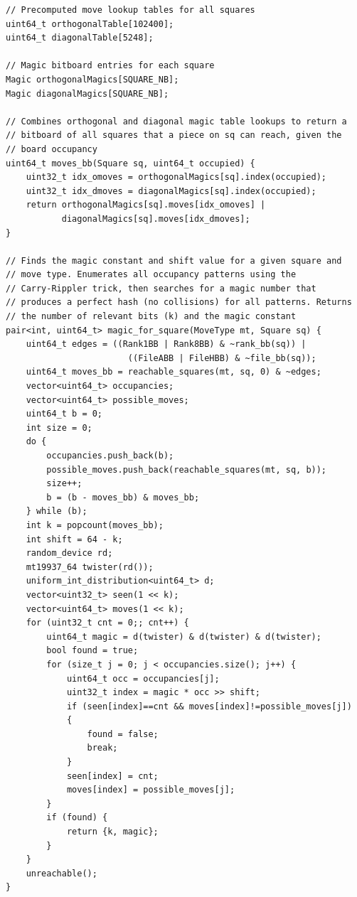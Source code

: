 \documentclass[12pt,a4paper,twoside,openright]{book}
\begin{document}
\begin{mdframed}[skipabove=\baselineskip,topline=false,rightline=false,bottomline=false,leftline=false,linewidth=1pt,linecolor=gray!40,innerleftmargin=8pt]
\begin{verbatim}
// Precomputed move lookup tables for all squares
uint64_t orthogonalTable[102400];
uint64_t diagonalTable[5248];

// Magic bitboard entries for each square
Magic orthogonalMagics[SQUARE_NB];
Magic diagonalMagics[SQUARE_NB];

// Combines orthogonal and diagonal magic table lookups to return a 
// bitboard of all squares that a piece on sq can reach, given the 
// board occupancy
uint64_t moves_bb(Square sq, uint64_t occupied) {
    uint32_t idx_omoves = orthogonalMagics[sq].index(occupied);
    uint32_t idx_dmoves = diagonalMagics[sq].index(occupied);
    return orthogonalMagics[sq].moves[idx_omoves] | 
           diagonalMagics[sq].moves[idx_dmoves];
}

// Finds the magic constant and shift value for a given square and
// move type. Enumerates all occupancy patterns using the
// Carry-Rippler trick, then searches for a magic number that
// produces a perfect hash (no collisions) for all patterns. Returns
// the number of relevant bits (k) and the magic constant
pair<int, uint64_t> magic_for_square(MoveType mt, Square sq) {
    uint64_t edges = ((Rank1BB | Rank8BB) & ~rank_bb(sq)) |
                        ((FileABB | FileHBB) & ~file_bb(sq));
    uint64_t moves_bb = reachable_squares(mt, sq, 0) & ~edges;
    vector<uint64_t> occupancies;
    vector<uint64_t> possible_moves;
    uint64_t b = 0;
    int size = 0;
    do {
        occupancies.push_back(b);
        possible_moves.push_back(reachable_squares(mt, sq, b));
        size++;
        b = (b - moves_bb) & moves_bb;
    } while (b);
    int k = popcount(moves_bb);
    int shift = 64 - k;
    random_device rd;
    mt19937_64 twister(rd());
    uniform_int_distribution<uint64_t> d;
    vector<uint32_t> seen(1 << k);
    vector<uint64_t> moves(1 << k);
    for (uint32_t cnt = 0;; cnt++) {
        uint64_t magic = d(twister) & d(twister) & d(twister);
        bool found = true;
        for (size_t j = 0; j < occupancies.size(); j++) {
            uint64_t occ = occupancies[j];
            uint32_t index = magic * occ >> shift;
            if (seen[index]==cnt && moves[index]!=possible_moves[j])
            {
                found = false;
                break;
            }
            seen[index] = cnt;
            moves[index] = possible_moves[j];
        }
        if (found) {
            return {k, magic};
        }
    }
    unreachable();
}


\end{verbatim}
\end{mdframed}
\end{document}
